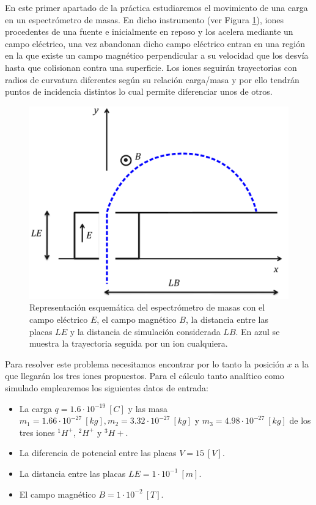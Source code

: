 \documentclass[journal]{IEEEtran}
\begin{document}
En este primer apartado de la práctica estudiaremos el movimiento de una carga en un espectrómetro de masas. En dicho instrumento (ver Figura \ref{fig:espetrometro}), iones procedentes de una fuente e inicialmente en reposo y los acelera mediante un campo eléctrico, una vez abandonan dicho campo eléctrico entran en una región en la que existe un campo magnético perpendicular a su velocidad que los desvía hasta que colisionan contra una superficie. Los iones seguirán trayectorias con radios de curvatura diferentes según su relación carga/masa y por ello tendrán puntos de incidencia distintos lo cual permite diferenciar unos de otros.

\begin{figure}[!htb]
    \includegraphics[width=\linewidth]{espectrometro.png}
    \caption{Representación esquemática del espectrómetro de masas con el campo eléctrico $E$, el campo magnético $B$, la distancia entre las placas $LE$ y la distancia de simulación considerada $LB$. En azul se muestra la trayectoria seguida por un ion cualquiera.}
    \label{fig:espetrometro}
\end{figure}

Para resolver este problema necesitamos encontrar por lo tanto la posición $x$ a la que llegarán los tres iones propuestos. Para el cálculo tanto analítico como simulado emplearemos los siguientes datos de entrada:

\begin{itemize}
    \item La carga $q = 1.6\cdot10^{-19}~[C]$ y las masa $m_1 = 1.66\cdot10^{-27}~[kg], m_2 = 3.32\cdot10^{-27}~[kg]$ y $m_3 = 4.98\cdot10^{-27}~[kg]$ de los tres iones $^1H^+$, $^2H^+$ y $^3H+$.
    \item La diferencia de potencial entre las placas $V = 15~[V]$.
    \item La distancia entre las placas $LE = 1\cdot 10^{-1}~[m]$.
    \item El campo magnético $B = 1\cdot10^{-2}~[T]$.
\end{itemize}
\end{document}
